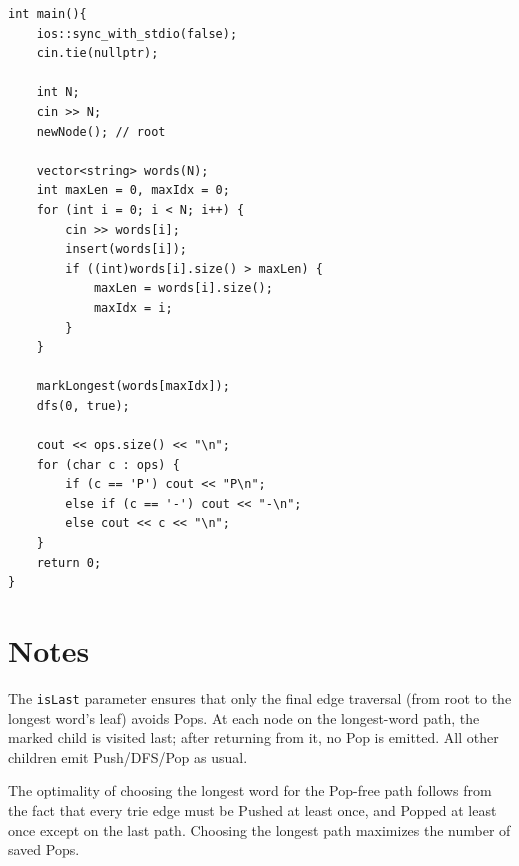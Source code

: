 \documentclass[11pt,a4paper]{article}
\begin{document}
\begin{lstlisting}
int main(){
    ios::sync_with_stdio(false);
    cin.tie(nullptr);

    int N;
    cin >> N;
    newNode(); // root

    vector<string> words(N);
    int maxLen = 0, maxIdx = 0;
    for (int i = 0; i < N; i++) {
        cin >> words[i];
        insert(words[i]);
        if ((int)words[i].size() > maxLen) {
            maxLen = words[i].size();
            maxIdx = i;
        }
    }

    markLongest(words[maxIdx]);
    dfs(0, true);

    cout << ops.size() << "\n";
    for (char c : ops) {
        if (c == 'P') cout << "P\n";
        else if (c == '-') cout << "-\n";
        else cout << c << "\n";
    }
    return 0;
}
\end{lstlisting}

\section{Notes}
The \texttt{isLast} parameter ensures that only the final edge traversal (from root to the longest word's leaf) avoids Pops. At each node on the longest-word path, the marked child is visited last; after returning from it, no Pop is emitted. All other children emit Push/DFS/Pop as usual.

The optimality of choosing the longest word for the Pop-free path follows from the fact that every trie edge must be Pushed at least once, and Popped at least once except on the last path. Choosing the longest path maximizes the number of saved Pops.
\end{document}
